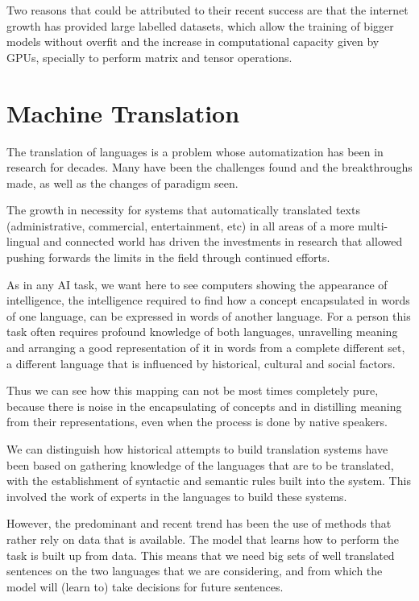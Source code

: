 \documentclass[11pt,english,listoffigures,listoftables]{tfgetsinf}
\begin{document}

Two reasons that could be attributed to their recent success are that the internet growth has provided large labelled datasets, which allow the training of bigger models without overfit and the increase in computational capacity given by GPUs, specially to perform matrix and tensor operations.

\section{Machine Translation}\label{mt}
The translation of languages is a problem whose automatization has been in research for decades. Many have been the challenges found and the breakthroughs made, as well as the changes of paradigm seen.

The growth in necessity for systems that automatically translated texts (administrative, commercial, entertainment, etc) in all areas of a more multi-lingual and connected world has driven the investments in research that allowed pushing forwards the limits in the field through continued efforts. 

As in any AI task, we want here to see computers showing the appearance of intelligence, the intelligence required to find how a concept encapsulated in words of one language, can be expressed in words of another language. For a person this task often requires profound knowledge of both languages, unravelling meaning and arranging a good representation of it in words from a complete different set, a different language that is influenced by historical, cultural and social factors.

Thus we can see how this mapping can not be most times completely pure, because there is noise in the encapsulating of concepts and in distilling meaning from their representations, even when the process is done by native speakers.

We can distinguish how historical attempts to build translation systems have been based on gathering knowledge of the languages that are to be translated, with the establishment of syntactic and semantic rules built into the system. This involved the work of experts in the languages to build these systems.

However, the predominant and recent trend has been the use of methods that rather rely on data that is available. The model that learns how to perform the task is built up from data. 
This means that we need big sets of well translated sentences on the two languages that we are considering, and from which the model will (learn to) take decisions for future sentences.
\end{document}
